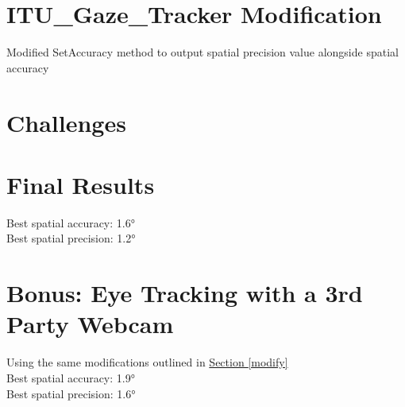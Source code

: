 \documentclass[11pt]{article}
\begin{document}
\section{ITU\_Gaze\_Tracker Modification} %
Modified SetAccuracy method to output spatial precision value alongside spatial accuracy
\section{Challenges} %

\section{Final Results} %
Best spatial accuracy: \ang{1.6} \\
Best spatial precision: \ang{1.2}

\section{Bonus: Eye Tracking with a 3rd Party Webcam}
Using the same modifications outlined in  \hyperref[modify]{Section \ref{modify}} \\
Best spatial accuracy: \ang{1.9} \\
Best spatial precision: \ang{1.6}

\end{document}
